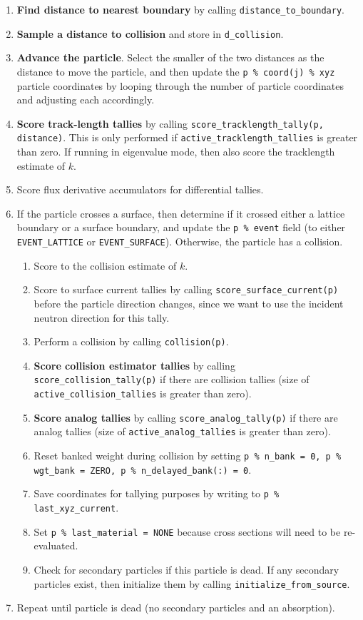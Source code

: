 \documentclass[10pt]{article}
\numberwithin{equation}{section} %
\begin{document}
\begin{enumerate}
\item {\bf Find distance to nearest boundary} by calling {\tt distance\_to\_boundary}.
\item {\bf Sample a distance to collision} and store in {\tt d\_collision}. 
\item {\bf Advance the particle}. Select the smaller of the two distances as the distance to move the particle, and then update the {\tt p \% coord(j) \% xyz} particle coordinates by looping through the number of particle coordinates and adjusting each accordingly.
\item {\bf Score track-length tallies} by calling {\tt score\_tracklength\_tally(p, distance)}. This is only performed if {\tt active\_tracklength\_tallies} is greater than zero. If running in eigenvalue mode, then also score the tracklength estimate of \(k\).
\item Score flux derivative accumulators for differential tallies.
\item If the particle crosses a surface, then determine if it crossed either a lattice boundary or a surface boundary, and update the {\tt p \% event} field (to either {\tt EVENT\_LATTICE} or {\tt EVENT\_SURFACE}). Otherwise, the particle has a collision.
	\begin{enumerate}
	\item Score to the collision estimate of \(k\).
	\item Score to surface current tallies by calling {\tt score\_surface\_current(p)} before the particle direction changes, since we want to use the incident neutron direction for this tally.
	\item Perform a collision by calling {\tt collision(p)}. 
	\item {\bf Score collision estimator tallies} by calling {\tt score\_collision\_tally(p)} if there are collision tallies (size of {\tt active\_collision\_tallies} is greater than zero). 
	\item {\bf Score analog tallies} by calling {\tt score\_analog\_tally(p)} if there are analog tallies (size of {\tt active\_analog\_tallies} is greater than zero).
	\item Reset banked weight during collision by setting {\tt p \% n\_bank = 0, p \% wgt\_bank = ZERO, p \% n\_delayed\_bank(:) = 0}. 
	\item Save coordinates for tallying purposes by writing to {\tt p \% last\_xyz\_current}. 
	\item Set {\tt p \% last\_material = NONE} because cross sections will need to be re-evaluated. 
	\item Check for secondary particles if this particle is dead. If any secondary particles exist, then initialize them by calling {\tt initialize\_from\_source}. 
	\end{enumerate}
	\item Repeat until particle is dead (no secondary particles and an absorption).
\end{enumerate}
\end{document}

